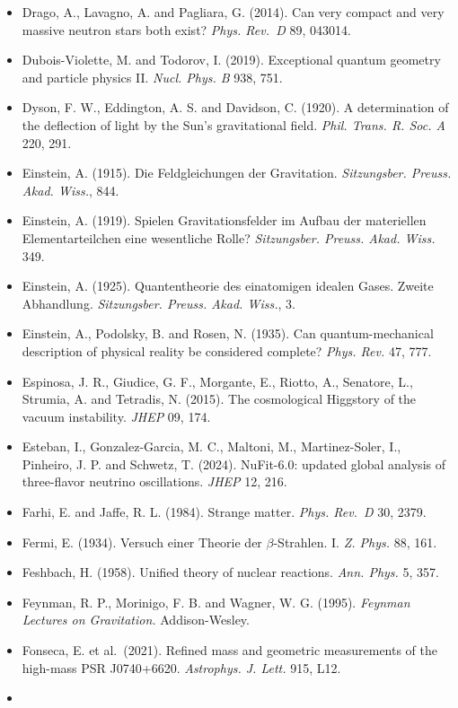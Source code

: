 \documentclass[
  11pt,
]{article}
\begin{document}
\begin{itemize}
\item
  Drago, A., Lavagno, A. and Pagliara, G. (2014). Can very compact and very massive neutron stars both exist? \emph{Phys. Rev.~D} 89, 043014.
\item
  Dubois-Violette, M. and Todorov, I. (2019). Exceptional quantum geometry and particle physics II. \emph{Nucl. Phys. B} 938, 751.
\item
  Dyson, F. W., Eddington, A. S. and Davidson, C. (1920). A determination of the deflection of light by the Sun's gravitational field. \emph{Phil. Trans. R. Soc. A} 220, 291.
\item
  Einstein, A. (1915). Die Feldgleichungen der Gravitation. \emph{Sitzungsber. Preuss. Akad. Wiss.}, 844.
\item
  Einstein, A. (1919). Spielen Gravitationsfelder im Aufbau der materiellen Elementarteilchen eine wesentliche Rolle? \emph{Sitzungsber. Preuss. Akad. Wiss.} 349.
\item
  Einstein, A. (1925). Quantentheorie des einatomigen idealen Gases. Zweite Abhandlung. \emph{Sitzungsber. Preuss. Akad. Wiss.}, 3.
\item
  Einstein, A., Podolsky, B. and Rosen, N. (1935). Can quantum-mechanical description of physical reality be considered complete? \emph{Phys. Rev.} 47, 777.
\item
  Espinosa, J. R., Giudice, G. F., Morgante, E., Riotto, A., Senatore, L., Strumia, A. and Tetradis, N. (2015). The cosmological Higgstory of the vacuum instability. \emph{JHEP} 09, 174.
\item
  Esteban, I., Gonzalez-Garcia, M. C., Maltoni, M., Martinez-Soler, I., Pinheiro, J. P. and Schwetz, T. (2024). NuFit-6.0: updated global analysis of three-flavor neutrino oscillations. \emph{JHEP} 12, 216.
\item
  Farhi, E. and Jaffe, R. L. (1984). Strange matter. \emph{Phys. Rev.~D} 30, 2379.
\item
  Fermi, E. (1934). Versuch einer Theorie der \ensuremath{\beta}-Strahlen. I. \emph{Z. Phys.} 88, 161.
\item
  Feshbach, H. (1958). Unified theory of nuclear reactions. \emph{Ann. Phys.} 5, 357.
\item
  Feynman, R. P., Morinigo, F. B. and Wagner, W. G. (1995). \emph{Feynman Lectures on Gravitation.} Addison-Wesley.
\item
  Fonseca, E. et al.~(2021). Refined mass and geometric measurements of the high-mass PSR J0740+6620. \emph{Astrophys. J. Lett.} 915, L12.
\item

\end{itemize}
\end{document}
